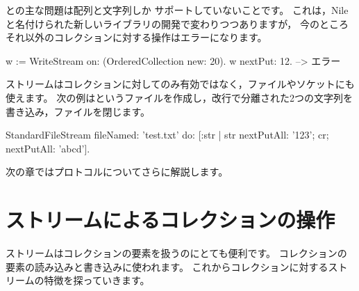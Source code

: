 \documentclass[a4paper,10pt,twoside]{book}
\begin{document}
との主な問題は配列と文字列しか
サポートしていないことです。
これは，Nileと名付けられた新しいライブラリの開発で変わりつつありますが，
今のところそれ以外のコレクションに対する操作はエラーになります。

\begin{code}{}
w := WriteStream on: (OrderedCollection new: 20).
w nextPut: 12. -->  エラー
\end{code}

ストリームはコレクションに対してのみ有効ではなく，ファイルやソケットにも使えます。
次の例はというファイルを作成し，改行で分離された2つの文字列を書き込み，ファイルを閉じます。

\begin{code}{}
StandardFileStream
  fileNamed: 'test.txt'
  do: [:str | str
                nextPutAll: '123';
                cr;
                nextPutAll: 'abcd'].
\end{code}

次の章ではプロトコルについてさらに解説します。

\section{ストリームによるコレクションの操作}

ストリームはコレクションの要素を扱うのにとても便利です。
コレクションの要素の読み込みと書き込みに使われます。
これからコレクションに対するストリームの特徴を探っていきます。
\end{document}
